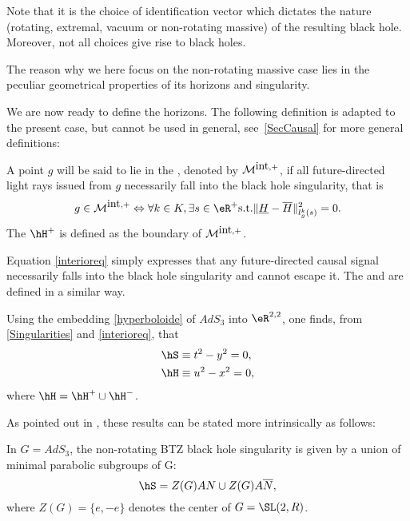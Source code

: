  Note that it is the choice of identification vector which dictates the nature (rotating, extremal, vacuum or non-rotating massive) of the resulting black hole. Moreover, not all choices give rise to black holes.

 The reason why we here focus on the non-rotating massive case lies in the peculiar geometrical properties of its horizons and singularity.

 We are now ready to define the horizons. The following definition is adapted to the present case, but cannot be used in general, see~\ref{SecCausal} for more general definitions:

 \begin{definition}
 A point $g$ will be said to lie in the , denoted by ${\cal M}^{\mbox{int},+}$, if all future-directed light rays issued from $g$ necessarily fall into the black hole singularity, that is
 \begin{equation}\label{interioreq}
 g \in {\cal M}^{\mbox{int},+} \Leftrightarrow \forall k \in K, \exists s \in
 \eR^+  \mbox{s.t.}  \|\underline{H} - \overline{H}\|^2_{l^k_g (s)}=0.
 \end{equation}
 The  $\hH^+$ is defined as the boundary of ${\cal M}^{\mbox{int},+}$.
 \label{interior-horizons}
 \end{definition}
 Equation \eqref{interioreq} simply expresses that any future-directed causal signal necessarily falls into the black hole singularity and cannot escape it. The  and  are defined in a similar way.

Using the embedding \eqref{hyperboloide} of $AdS_3$ into $\eR^{2,2}$, one finds, from \eqref{Singularities} and \eqref{interioreq}, that
\begin{equation}		\label{BTZSingHor}
	\begin{aligned}[]
		\hS	&\equiv t^2 - y^2 = 0,\\
		\hH	&\equiv u^2 - x^2 = 0,
	\end{aligned}
\end{equation}
 where $\hH = \hH^+ \cup \hH^-$.

As pointed out in \cite{Keio}, these results can be stated more intrinsically as follows:
\begin{proposition}
	In $G=AdS_3$, the non-rotating BTZ black hole singularity is given by a union of minimal parabolic subgroups of G:
	\begin{equation}
	\hS = Z(G) A N \cup Z(G) A \overline{N},
	 \end{equation}
	 where $Z(G)=\{e,-e\}$ denotes the center of $G=\SL(2,R)$.
	\label{BTZSing}
\end{proposition}

